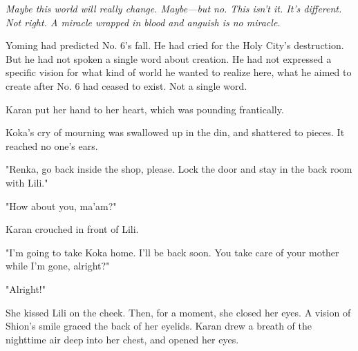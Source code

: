 \emph{Maybe this world will really change. Maybe---but no. This isn't it. It's
different. Not right. A miracle wrapped in blood and anguish is no
miracle.}

Yoming had predicted No. 6's fall. He had cried for the Holy City's
destruction. But he had not spoken a single word about creation. He had
not expressed a specific vision for what kind of world he wanted to
realize here, what he aimed to create after No. 6 had ceased to exist.
Not a single word.

Karan put her hand to her heart, which was pounding frantically.

Koka's cry of mourning was swallowed up in the din, and shattered to
pieces. It reached no one's ears.

"Renka, go back inside the shop, please. Lock the door and stay in the
back room with Lili."

"How about you, ma'am?"

Karan crouched in front of Lili.

"I'm going to take Koka home. I'll be back soon. You take care of your
mother while I'm gone, alright?"

"Alright!"

She kissed Lili on the cheek. Then, for a moment, she closed her eyes. A
vision of Shion's smile graced the back of her eyelids. Karan drew a
breath of the nighttime air deep into her chest, and opened her eyes.
